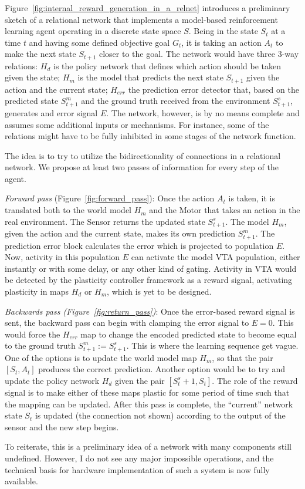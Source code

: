 Figure~\ref{fig:internal_reward_generation_in_a_relnet} introduces a preliminary sketch of a relational network that implements a model-based reinforcement learning agent operating in a discrete state space $S$. Being in the state $S_t$ at a time $t$ and having some defined objective goal $G_t$, it is taking an action $A_t$ to make the next state $S_{t+1}$ closer to the goal. The network would have three 3-way relations: $H_d$ is the policy network that defines which action should be taken given the state; $H_m$ is the model that predicts the next state $S_{t+1}$ given the action and the current state; $H_{err}$ the prediction error detector that, based on the predicted state $S^m_{t+1}$ and the ground truth received from the environment $S^s_{t+1}$, generates and error signal $E$. The network, however, is by no means complete and assumes some additional inputs or mechanisms. For instance, some of the relations might have to be fully inhibited in some stages of the network function.

The idea is to try to utilize the bidirectionality of connections in a relational network. We propose at least two passes of information for every step of the agent.

\emph{Forward pass} (Figure~\ref{fig:forward_pass}): Once the action $A_t$ is taken, it is translated both to the world model $H_m$ and the Motor that takes an action in the real environment. The Sensor returns the updated state $S^s_{t+1}$. The model $H_m$, given the action and the current state, makes its own prediction $S^m_{t+1}$. The prediction error block calculates the error which is projected to population $E$. Now, activity in this population $E$ can activate the model VTA population, either instantly or with some delay, or any other kind of gating. Activity in VTA would be detected by the plasticity controller framework as a reward signal, activating plasticity in maps $H_d$ or $H_m$, which is yet to be designed.

\emph{Backwards pass (Figure~\ref{fig:return_pass})}: Once the error-based reward signal is sent, the backward pass can begin with clamping the error signal to $E=0$. This would force the $H_{err}$ map to change the encoded predicted state to become equal to the ground truth $S^m_{t+1}:=S^s_{t+1}$. This is where the learning sequence get vague. One of the options is to update the world model map $H_m$, so that the pair $[S_t, A_t]$ produces the correct prediction. Another option would be to try and update the policy network $H_d$ given the pair $[S^s_t+1, S_t]$. The role of the reward signal is to make either of these maps plastic for some period of time such that the mapping can be updated. After this pass is complete, the ``current'' network state $S_t$ is updated (the connection not shown) according to the output of the sensor and the new step begins.

To reiterate, this is a preliminary idea of a network with many components still undefined. However, I do not see any major impossible operations, and the technical basis for hardware implementation of such a system is now fully available.
